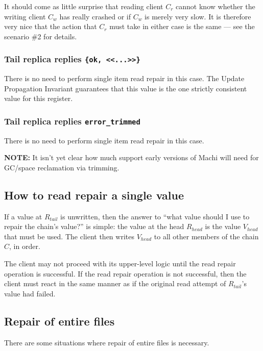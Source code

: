 \documentclass[preprint,10pt]{sigplanconf}
\begin{document}
It should come as little surprise that reading client $C_r$
cannot know whether the writing client $C_w$
has really crashed or if $C_w$ is merely very slow.
It is therefore very nice that
the action that $C_r$ must take in either case is the same --- see the
scenario \#2 for details.

\subsubsection{Tail replica replies {\tt \{ok, <<...>>\}}}

There is no need to perform single item read repair in this case.
The Update Propagation Invariant guarantees that this value is the one
strictly consistent value for this register.

\subsubsection{Tail replica replies {\tt error\_trimmed}}

There is no need to perform single item read repair in this case.

{\bf NOTE:} It isn't yet clear how much support early versions of
Machi will need for GC/space reclamation via trimming.

\subsection{How to read repair a single value}
\label{sub:read-repair-single}

If a value at $R_{tail}$ is unwritten, then the answer to ``what value
should I use to repair the chain's value?'' is simple: the value at the
head $R_{head}$ is the value $V_{head}$ that must be used.  The client
then writes $V_{head}$ to all other members of the chain $C$, in
order.

The client may not proceed with its upper-level logic until the read
repair operation is successful.  If the read repair operation is not
successful, then the client must react in the same manner as if the
original read attempt of $R_{tail}$'s value had failed.

\subsection{Repair of entire files}
\label{sub:repair-entire-files}

There are some situations where repair of entire files is necessary.
\end{document}
